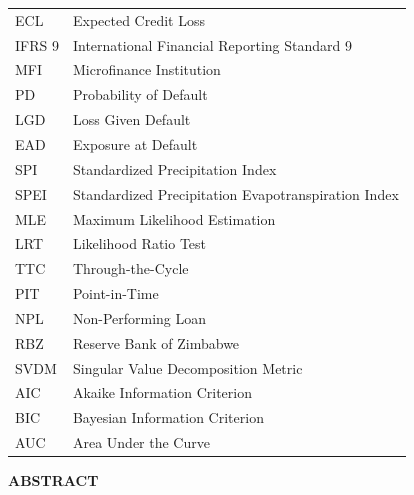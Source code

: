 \documentclass[12pt,a4paper]{article}
\begin{document}
\begin{tabular}{@{}p{3cm}p{12cm}@{}}
ECL & Expected Credit Loss \\[0.3cm]
IFRS 9 & International Financial Reporting Standard 9 \\[0.3cm]
MFI & Microfinance Institution \\[0.3cm]
PD & Probability of Default \\[0.3cm]
LGD & Loss Given Default \\[0.3cm]
EAD & Exposure at Default \\[0.3cm]
SPI & Standardized Precipitation Index \\[0.3cm]
SPEI & Standardized Precipitation Evapotranspiration Index \\[0.3cm]
MLE & Maximum Likelihood Estimation \\[0.3cm]
LRT & Likelihood Ratio Test \\[0.3cm]
TTC & Through-the-Cycle \\[0.3cm]
PIT & Point-in-Time \\[0.3cm]
NPL & Non-Performing Loan \\[0.3cm]
RBZ & Reserve Bank of Zimbabwe \\[0.3cm]
SVDM & Singular Value Decomposition Metric \\[0.3cm]
AIC & Akaike Information Criterion \\[0.3cm]
BIC & Bayesian Information Criterion \\[0.3cm]
AUC & Area Under the Curve \\[0.3cm]
\end{tabular}

\newpage

\tableofcontents

\newpage

\listoftables

\newpage

\listoffigures

\newpage

\thispagestyle{empty}

\begin{center}
{\Large\bfseries ABSTRACT}
\end{center}
\end{document}
